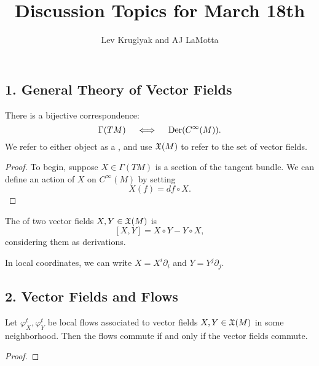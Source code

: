 \documentclass{lkx_paper}
\title{\textbf{Discussion Topics for March 18th}}
\date{}
\author{Lev Kruglyak and AJ LaMotta}
\begin{document}
\maketitle

\subsection*{1. General Theory of Vector Fields}

\begin{theorem*}
	There is a bijective correspondence:
	\[
		\Gamma(TM) \quad\iff\quad \mathrm{Der}(C^\infty(M)).
	\]
	We refer to either object as a , and use $\mathfrak{X}(M)$ to refer to the set of vector fields.
\end{theorem*}
\begin{proof}
	To begin, suppose $X\in \Gamma(TM)$ is a section of the tangent bundle. We can define an action of $X$ on $C^\infty(M)$ by setting
	\[
		X(f) = df\circ X.
	\]
\end{proof}

\begin{definition*}
	The  of two vector fields $X,Y\in \mathfrak{X}(M)$ is
	\[
		[X,Y] = X\circ Y - Y\circ X,
	\]
	considering them as derivations.
\end{definition*}

In local coordinates, we can write $X=X^i\partial_i$ and $Y=Y^j\partial_j$.

\subsection*{2. Vector Fields and Flows}

\begin{theorem*}
	Let $\varphi_X^t, \varphi_Y^t$ be local flows associated to vector fields $X,Y\in \mathfrak{X}(M)$ in some neighborhood. Then the flows commute if and only if the vector fields commute.
\end{theorem*}

\begin{proof}

\end{proof}
\end{document}

